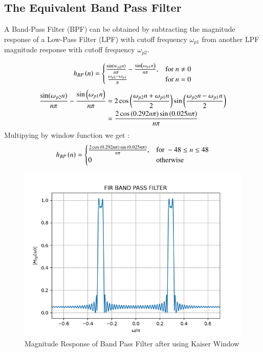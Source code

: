 \documentclass{article}
\begin{document}
\subsection{The Equivalent Band Pass Filter}
A Band-Pass Filter (BPF) can be obtained by subtracting the magnitude response of a Low-Pass Filter (LPF) with cutoff frequency $\omega_{p1}$ from another LPF magnitude response with cutoff frequency $\omega_{p2}$.

\begin{align}
    h_{BP}\left(n\right) = 
\begin{cases} 
    \frac{\sin(w_{p2} n)}{n\pi} -\frac{\sin\left(\omega_{p1}n\right)}{n\pi},  & \text{for } n\neq 0\\\
    \frac{\omega_{p2}-\omega_{p1}}{\pi} &\text{for } n= 0
\end{cases} \label{eq:h(n)desired_for_LPF}
\end{align}
\begin{align}
     \frac{\sin(\omega_{p2} n)}{n\pi} -\frac{\sin\left(\omega_{p1}n\right)}{n\pi} &= 2\cos{\ensuremath{\left(\frac{\omega_{p2}n+\omega_{p1}n}{2}\right)}}\sin{\ensuremath{\left(\frac{\omega_{p2}n-\omega_{p1}n}{2}\right)}}\\
            &= \frac{2\cos{\ensuremath{\left(0.292n\pi\right)}}\sin{\ensuremath{\left(0.025n\pi\right)}}}{n\pi}
\end{align}
Multipying by window function we get :
\begin{align}
    h_{BP}\left(n\right) = 
\begin{cases} 
   \frac{2\cos{\ensuremath{\left(0.292n\pi\right)}}\sin{\ensuremath{\left(0.025n\pi\right)}}}{n\pi},  & \text{for } -48\leq n \leq 48 \\
    0 &\text{otherwise}
\end{cases} \label{eq:h_BP(n)desired_for_LPF}
\end{align}

\begin{figure}[H]
\centering
\includegraphics[width=1\columnwidth]{figs/bp_filt_kw.png}
\caption{Magnitude Response of Band Pass Filter after using Kaiser Window}
\label{fig:Kaiser_BPF_response}
\end{figure}
\end{document}
